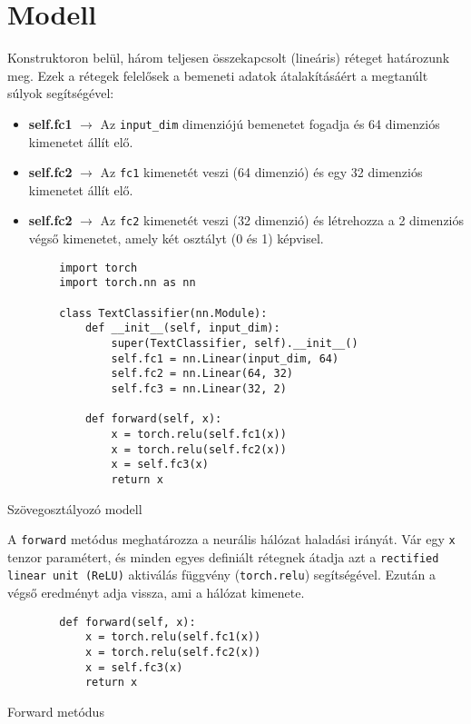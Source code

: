 \section{Modell}
\begin{flushleft}
    Konstruktoron belül, három teljesen összekapcsolt (lineáris) réteget határozunk meg. Ezek a rétegek felelősek a bemeneti adatok átalakításáért a megtanúlt súlyok segítségével:
    \begin{itemize}
        \item \textbf{self.fc1} $\rightarrow$ Az \verb|input_dim| dimenziójú bemenetet fogadja és 64 dimenziós kimenetet állít elő.
        \item \textbf{self.fc2} $\rightarrow$ Az \verb|fc1| kimenetét veszi (64 dimenzió) és egy 32 dimenziós kimenetet állít elő.
        \item \textbf{self.fc2} $\rightarrow$ Az \verb|fc2| kimenetét veszi (32 dimenzió) és létrehozza a 2 dimenziós végső kimenetet, amely két osztályt (0 és 1) képvisel.
    \end{itemize}
\end{flushleft}
\begin{listing}[H]
    \begin{verbatim}
        import torch
        import torch.nn as nn

        class TextClassifier(nn.Module):
            def __init__(self, input_dim):
                super(TextClassifier, self).__init__()
                self.fc1 = nn.Linear(input_dim, 64)
                self.fc2 = nn.Linear(64, 32)
                self.fc3 = nn.Linear(32, 2)

            def forward(self, x):
                x = torch.relu(self.fc1(x))
                x = torch.relu(self.fc2(x))
                x = self.fc3(x)
                return x
    \end{verbatim}
    \caption{Szövegosztályozó modell}
    \label{code:modell}
\end{listing}

\newpage
\begin{flushleft}
    A \verb|forward| metódus meghatározza a neurális hálózat haladási irányát. Vár egy \verb|x| tenzor paramétert, és minden egyes definiált rétegnek átadja azt a \verb|rectified linear unit (ReLU)| aktiválás függvény (\verb|torch.relu|) segítségével. Ezután a végső eredményt adja vissza, ami a hálózat kimenete.
\end{flushleft}
\begin{listing}[H]
    \begin{verbatim}
        def forward(self, x):
            x = torch.relu(self.fc1(x))
            x = torch.relu(self.fc2(x))
            x = self.fc3(x)
            return x
    \end{verbatim}
    \caption{Forward metódus}
    \label{code:forward}
\end{listing}

